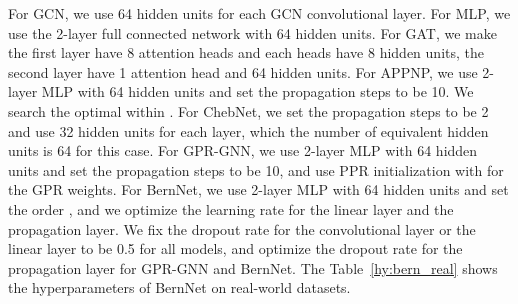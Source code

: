 \documentclass{article}
\begin{document}
\begin{table}[t]
\centering
\caption{ Hyperparameters for BernNet on real-world datasets.}
\label{hy:bern_real}
\end{table}

For GCN, we use 64 hidden units for each GCN convolutional layer. For MLP, we use the 2-layer full connected network with 64 hidden units. For GAT, we make the first layer have 8 attention heads and each heads have 8 hidden units, the second layer have 1 attention head and 64 hidden units. For APPNP, we use 2-layer MLP with 64 hidden units and set the propagation steps  to be 10. We search the optimal  within . For ChebNet, we set the propagation steps  to be 2 and use 32 hidden units for each layer, which the number of equivalent hidden units is 64 for this case. For GPR-GNN, we use 2-layer MLP with 64 hidden units and set the propagation steps  to be 10, and use PPR initialization with  for the GPR weights. For BernNet, we use 2-layer MLP with 64 hidden units and set the order , and we optimize the learning rate for the linear layer and the propagation layer. We fix the dropout rate for the convolutional layer or the linear layer to be 0.5 for all models, and optimize the dropout rate for the propagation layer for GPR-GNN and BernNet. The Table~\ref{hy:bern_real} shows the hyperparameters of BernNet on real-world datasets.
\end{document}
